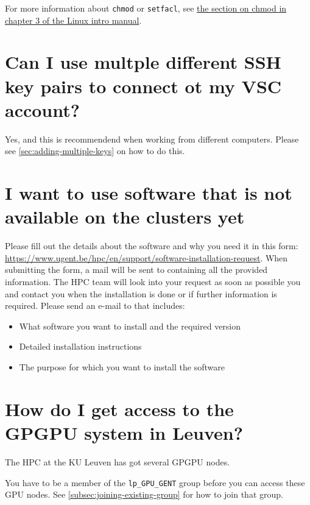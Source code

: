 For more information about \lstinline|chmod| or \lstinline|setfacl|, see \href{\LinuxManualURL#sec:chmod}
{the section on chmod in chapter 3 of the Linux intro manual}.

\section{Can I use multple different SSH key pairs to connect ot my VSC account?}

Yes, and this is recommendend when working from different computers. Please see
\autoref{sec:adding-multiple-keys} on how to do this.

\section{I want to use software that is not available on the clusters yet}

\ifgent
Please fill out the details about the software and why you need it in this form:
\url{https://www.ugent.be/hpc/en/support/software-installation-request}.
When submitting the form, a mail will be sent to \hpcinfo containing all the
provided information. The HPC team will look into your request as soon as possible
you and contact you when the installation is done or if further information is required.
\else
Please send an e-mail to \hpcinfo that includes:
\begin{itemize}
    \item What software you want to install and the required version
    \item Detailed installation instructions
    \item The purpose for which you want to install the software
\end{itemize}
\fi

\ifgent
\section{How do I get access to the GPGPU system in Leuven?}

The HPC at the KU Leuven has got several GPGPU nodes.

You have to be a member of the \lstinline|lp_GPU_GENT| group before you can
access these GPU nodes. See \autoref{subsec:joining-existing-group} for how to join that group.

